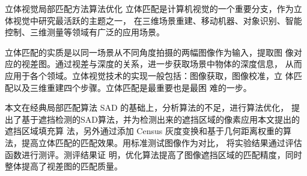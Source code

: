 \begin{Cabstract}{立体视觉}{局部匹配方法}{算法优化}{}{}
立体匹配是计算机视觉的一个重要分支，作为立体视觉中研究最活跃的主题之一，
在三维场景重建、移动机器、对象识别、智能控制、三维测量等领域有广泛的应用场景。 

立体匹配的实质是以同一场景从不同角度拍摄的两幅图像作为输入，提取图
像对应的视差图。通过视差与深度的关系，进一步获取场景中物体的深度信息，
从而应用于各个领域。立体视觉技术的实现一般包括：图像获取，图像校准，立
体匹配以及三维重建四个步骤。立体匹配是最重要也是最困
难的一步。

本文在经典局部匹配算法 SAD 的基础上，分析算法的不足，进行算法优化，
提出了基于遮挡检测的SAD算法，并为检测出来的遮挡区域的像素应用本文提出的遮挡区域填充算
法，另外通过添加 Census 灰度变换和基于几何距离权重的算法，提高立体匹配的匹配效果。用标准测试图像作为对比，
将实验结果通过评估函数进行测评。测评结果证
明，优化算法提高了图像遮挡区域的匹配精度，同时整体提高了视差图的匹配质量。
\end{Cabstract}

